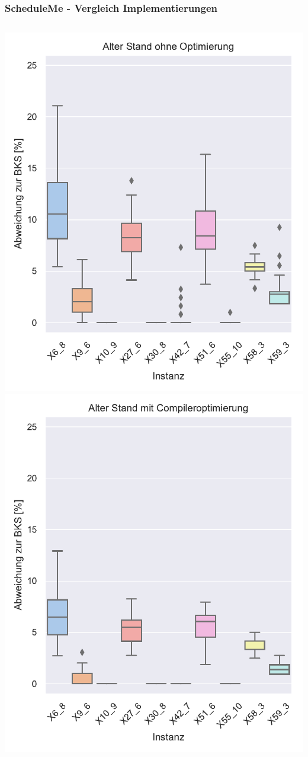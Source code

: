 \documentclass[aspectratio=169]{beamer}
\begin{document}
\begin{frame}
\frametitle{ScheduleMe - Vergleich Implementierungen}
	
	\begin{columns}[c]
			\includegraphics[width=\textwidth]{../images/results_old.pdf}	
			\includegraphics[width=\textwidth]{../images/results_oldo3.pdf}	

\end{columns}
\end{frame}
\end{document}
